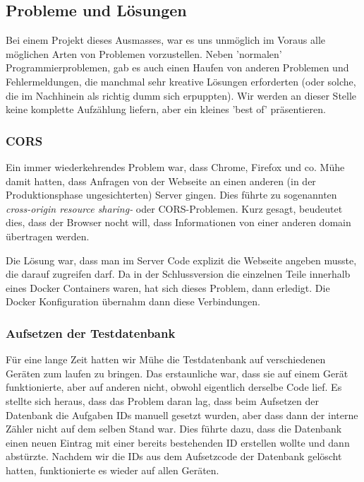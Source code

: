 \subsection{Probleme und Lösungen}

Bei einem Projekt dieses Ausmasses, war es uns unmöglich im Voraus alle möglichen Arten von Problemen vorzustellen. Neben 'normalen' Programmierproblemen, gab es auch einen Haufen von anderen Problemen und Fehlermeldungen, die manchmal sehr kreative Lösungen erforderten (oder solche, die im Nachhinein als richtig dumm sich erpuppten). Wir werden an dieser Stelle keine komplette Aufzählung liefern, aber ein kleines 'best of' präsentieren.

\subsubsection{CORS} 
Ein immer wiederkehrendes Problem war, dass Chrome, Firefox und co. Mühe damit hatten, dass Anfragen von der Webseite an einen anderen (in der Produktionsphase ungesichterten) Server gingen. Dies führte zu sogenannten \emph{cross-origin resource sharing-} oder CORS-Problemen. Kurz gesagt, beudeutet dies, dass der Browser nocht will, dass Informationen von einer anderen domain übertragen werden.

Die Lösung war, dass man im Server Code explizit die Webseite angeben musste, die darauf zugreifen darf. Da in der Schlussversion die einzelnen Teile innerhalb eines Docker Containers waren, hat sich dieses Problem, dann erledigt. Die Docker Konfiguration übernahm dann diese Verbindungen.

\subsubsection{Aufsetzen der Testdatenbank}
Für eine lange Zeit hatten wir Mühe die Testdatenbank auf verschiedenen Geräten zum laufen zu bringen. Das erstaunliche war, dass sie auf einem Gerät funktionierte, aber auf anderen nicht, obwohl eigentlich derselbe Code lief. Es stellte sich heraus, dass das Problem daran lag, dass beim Aufsetzen der Datenbank die Aufgaben IDs manuell gesetzt wurden, aber dass dann der interne Zähler nicht auf dem selben Stand war. Dies führte dazu, dass die Datenbank einen neuen Eintrag mit einer bereits bestehenden ID erstellen wollte und dann abstürzte. Nachdem wir die IDs aus dem Aufsetzcode der Datenbank gelöscht hatten, funktionierte es wieder auf allen Geräten.



